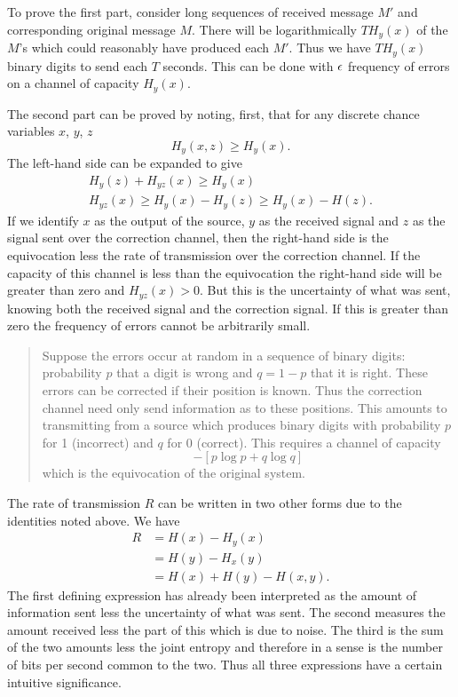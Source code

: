 To prove the first part, consider long sequences of received message $M'$
and corresponding original message $M$.  There will be logarithmically
$T H_y(x)$ of the $M$'s which could reasonably have produced each $M'$.
Thus we have $T H_y(x)$ binary digits to send each $T$ seconds.  This can
be done with $\epsilon$ frequency of errors on a channel of capacity $H_y(x)$.

The second part can be proved by noting, first, that for any discrete
chance variables $x$, $y$, $z$
$$
H_y(x,z) \ge H_y(x).
$$
The left-hand side can be expanded to give
\begin{gather*}
H_y(z) + H_{yz}(x) \ge H_y(x) \\
H_{yz}(x) \ge H_y(x) - H_y(z) \ge H_y(x) - H(z).
\end{gather*}
If we identify $x$ as the output of the source, $y$ as the received
signal and $z$ as the signal sent over the correction channel, then the
right-hand side is the equivocation less the rate of transmission over
the correction channel.  If the capacity of this channel is less than the
equivocation the right-hand side will be greater than zero and
$H_{yz}(x)>0$.  But this is the uncertainty of what was sent, knowing both
the received signal and the correction signal.  If this is greater than
zero the frequency of errors cannot be arbitrarily small.

\medskip{}
\begin{quote}
Suppose the errors occur at random in a sequence of binary digits:
probability $p$ that a digit is wrong and $q=1-p$ that it is right.
These errors can be corrected if their position is known.  Thus the
correction channel need only send information as to these positions.
This amounts to transmitting from a source which produces binary
digits with probability $p$ for 1 (incorrect) and $q$ for 0 (correct).
This requires a channel of capacity
$$
- [p \log p + q \log q ]
$$
which is the equivocation of the original system.
\end{quote}

The rate of transmission $R$ can be written in two other forms due to
the identities noted above.  We have
\begin{align*}
R &= H(x) - H_y(x) \\
&= H(y) - H_x(y) \\
&= H(x) + H(y) - H(x,y) .
\end{align*}
The first defining expression has already been interpreted as the amount
of information sent less the uncertainty of what was sent.  The second
measures the amount received less the part of this which is due to noise.
The third is the sum of the two amounts less the joint entropy and
therefore in a sense is the number of bits per second common to the two.
Thus all three expressions have a certain intuitive significance.


